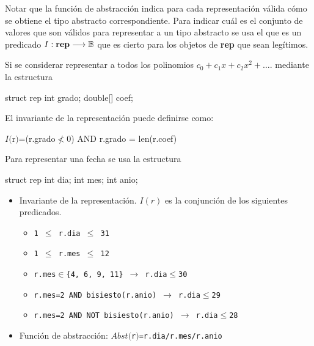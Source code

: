 Notar que la función de abstracción indica para cada representación válida cómo se obtiene el tipo abstracto correspondiente. Para indicar cuál es el conjunto de valores que son válidos para representar a un tipo abstracto se usa el  que es un predicado
$I: \mbox{\textbf{rep}} \longrightarrow \mathbb{B}$ que es cierto para los objetos de \textbf{rep} que sean legítimos.


\begin{example}
Si se considerar representar a todos los polinomios $c_0+c_1x+c_2x^2+\ldots$.
mediante la estructura
\begin{pyverbatim}
struct rep {
   int grado;
   double[] coef;
}
\end{pyverbatim}
El invariante de la representación puede definirse como:

\centerline{\ttfamily 
$I($r$)$=(r.grado$\not<$0) AND r.grado = len(r.coef)
}
\end{example}



\begin{example}{}\label{ejem:FechaSimple}
Para representar una fecha se usa la estructura
\begin{pyverbatim}
struct rep {
   int dia;
   int mes;
   int anio;
}
\end{pyverbatim}

\begin{itemize}
\item Invariante de la representación. $I(r)$ es la conjunción de los siguientes predicados.
\begin{itemize}
\item \texttt{1 $\leq$ r.dia $\leq$ 31}
\item \texttt{1 $\leq$ r.mes $\leq$ 12}
\item \texttt{r.mes$\in$\{4, 6, 9, 11\} $\rightarrow$ r.dia$\leq$30}
\item \texttt{r.mes=2 AND bisiesto(r.anio)  $\rightarrow$ r.dia$\leq$29}
\item \texttt{r.mes=2 AND NOT bisiesto(r.anio)  $\rightarrow$ r.dia$\leq$28}
\end{itemize}

\item Función de abstracción: \texttt{$Abst($r$)$=r.dia/r.mes/r.anio}
\end{itemize}
\end{example}





